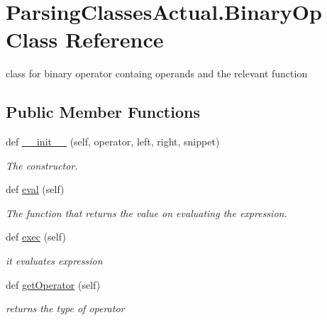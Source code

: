 \hypertarget{class_parsing_classes_actual_1_1_binary_op}{}\section{Parsing\+Classes\+Actual.\+Binary\+Op Class Reference}
\label{class_parsing_classes_actual_1_1_binary_op}


class for binary operator containg operands and the relevant function  


\subsection*{Public Member Functions}
\begin{DoxyCompactItemize}
\item 
def \hyperlink{class_parsing_classes_actual_1_1_binary_op_a3d8482575f41d191640a397be6806991}{\+\_\+\+\_\+init\+\_\+\+\_\+} (self, operator, left, right, snippet)
\begin{DoxyCompactList}\small\item\em The constructor. \end{DoxyCompactList}\item 
def \hyperlink{class_parsing_classes_actual_1_1_binary_op_a27757ec13077dda98775d2e3c6a29f65}{eval} (self)\hypertarget{class_parsing_classes_actual_1_1_binary_op_a27757ec13077dda98775d2e3c6a29f65}{}\label{class_parsing_classes_actual_1_1_binary_op_a27757ec13077dda98775d2e3c6a29f65}

\begin{DoxyCompactList}\small\item\em The function that returns the value on evaluating the expression. \end{DoxyCompactList}\item 
def \hyperlink{class_parsing_classes_actual_1_1_binary_op_a6ba5fdbdcda94f4f07e7d6c2f4438322}{exec} (self)\hypertarget{class_parsing_classes_actual_1_1_binary_op_a6ba5fdbdcda94f4f07e7d6c2f4438322}{}\label{class_parsing_classes_actual_1_1_binary_op_a6ba5fdbdcda94f4f07e7d6c2f4438322}

\begin{DoxyCompactList}\small\item\em it evaluates expression \end{DoxyCompactList}\item 
def \hyperlink{class_parsing_classes_actual_1_1_binary_op_ae926977b3df2b3567ccd6389e595d326}{get\+Operator} (self)\hypertarget{class_parsing_classes_actual_1_1_binary_op_ae926977b3df2b3567ccd6389e595d326}{}\label{class_parsing_classes_actual_1_1_binary_op_ae926977b3df2b3567ccd6389e595d326}

\begin{DoxyCompactList}\small\item\em returns the type of operator \end{DoxyCompactList}\end{DoxyCompactItemize}

